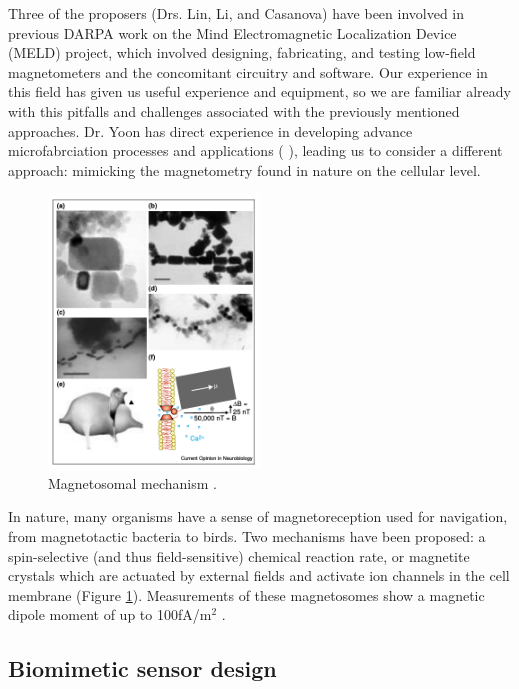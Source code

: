 Three of the proposers (Drs. Lin, Li, and Casanova) have been involved in previous DARPA work on the Mind Electromagnetic Localization Device (MELD) project, which involved designing, fabricating, and testing low-field magnetometers and the concomitant circuitry and software. Our experience in this field has given us useful experience and equipment, so we are familiar already with this pitfalls and challenges associated with the previously mentioned approaches. Dr. Yoon has direct experience in developing advance microfabrciation processes and applications (
\cite{yoon2003reduced,yoon2006multidirectional}), leading us to consider a different approach: mimicking the magnetometry found in nature on the cellular level.

\begin{figure}
\centering
\includegraphics[width=0.5\textwidth]{kirsh2001}
\caption{Magnetosomal mechanism \cite{kirschvink2001magnetite}.}
\label{fig:magnetosome}
\end{figure}

In nature, many organisms have a sense of magnetoreception used for navigation, from magnetotactic bacteria to birds. Two mechanisms have been proposed: a spin-selective (and thus field-sensitive) chemical reaction rate, or magnetite crystals which are actuated by external fields and activate ion channels in the cell membrane (Figure \ref{fig:magnetosome})\cite{johnsen2005physics,dodson2013radical,kirschvink2001magnetite}. Measurements of these magnetosomes show a magnetic dipole moment of up to 100fA/m$^2$ \cite{hanzlik2002pulsed,eder2012magnetic}.


\subsection{Biomimetic sensor design}

